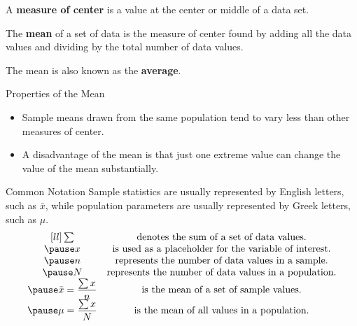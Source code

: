 \documentclass[handout]{beamer}
\begin{document}
\begin{frame}
\begin{definition}
A \textbf{measure of center} is a value at the center or middle of a data set.
\end{definition}\pause

\begin{definition}
The \textbf{mean} of a set of data is the measure of center found by adding all the data values and dividing by the total number of data values.
\end{definition}\pause

\begin{note}
The mean is also known as the \textbf{average}.
\end{note}\pause

\begin{block}{Properties of the Mean}
\begin{itemize}
\item Sample means drawn from the same population tend to vary less than other measures of center.\pause
\item A disadvantage of the mean is that just one extreme value can change the value of the mean substantially.
\end{itemize}
\end{block}
\end{frame}

\begin{frame}
\begin{block}{Common Notation}
Sample statistics are usually represented by English letters, such as $\bar{x}$, while population parameters are usually represented by Greek letters, such as $\mu$.\pause
\vspace{-4mm}
{\renewcommand*{\arraystretch}{2.2}
\begin{equation*}
\begin{matrix}[ll]
\sum & \text{denotes the sum of a set of data values.} \\\pause
x & \text{is used as a placeholder for the variable of interest.} \\\pause
n & \text{represents the number of data values in a sample.} \\\pause
N & \text{represents the number of data values in a population.} \\\pause
\bar{x}=\dfrac{\sum x}{n} & \text{is the mean of a set of sample values.} \\\pause
\mu = \dfrac{\sum x}{N} & \text{is the mean of all values in a population.}
\end{matrix}
\end{equation*}}
\end{block}
\end{frame}
\end{document}

